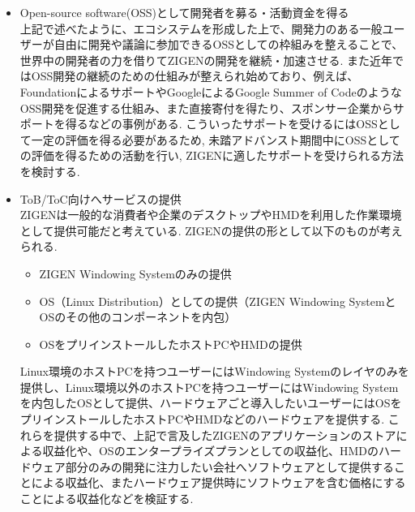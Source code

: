 \begin{itemize}
      \item Open-source software(OSS)として開発者を募る・活動資金を得る\\
            上記で述べたように、エコシステムを形成した上で、開発力のある一般ユーザーが自由に開発や議論に参加できるOSSとしての枠組みを整えることで、世界中の開発者の力を借りてZIGENの開発を継続・加速させる.
            また近年ではOSS開発の継続のための仕組みが整えられ始めており、例えば、FoundationによるサポートやGoogleによるGoogle Summer of CodeのようなOSS開発を促進する仕組み、また直接寄付を得たり、スポンサー企業からサポートを得るなどの事例がある.
            こういったサポートを受けるにはOSSとして一定の評価を得る必要があるため, 未踏アドバンスト期間中にOSSとしての評価を得るための活動を行い, ZIGENに適したサポートを受けられる方法を検討する.

      \item ToB/ToC向けへサービスの提供\\
            ZIGENは一般的な消費者や企業のデスクトップやHMDを利用した作業環境として提供可能だと考えている.
            ZIGENの提供の形として以下のものが考えられる.
            \begin{itemize}
                  \item ZIGEN Windowing Systemのみの提供
                  \item OS（Linux Distribution）としての提供（ZIGEN Windowing SystemとOSのその他のコンポーネントを内包）
                  \item OSをプリインストールしたホストPCやHMDの提供
            \end{itemize}
            Linux環境のホストPCを持つユーザーにはWindowing Systemのレイヤのみを提供し、Linux環境以外のホストPCを持つユーザーにはWindowing Systemを内包したOSとして提供、ハードウェアごと導入したいユーザーにはOSをプリインストールしたホストPCやHMDなどのハードウェアを提供する.
            これらを提供する中で、上記で言及したZIGENのアプリケーションのストアによる収益化や、OSのエンタープライズプランとしての収益化、HMDのハードウェア部分のみの開発に注力したい会社へソフトウェアとして提供することによる収益化、またハードウェア提供時にソフトウェアを含む価格にすることによる収益化などを検証する.

\end{itemize}
